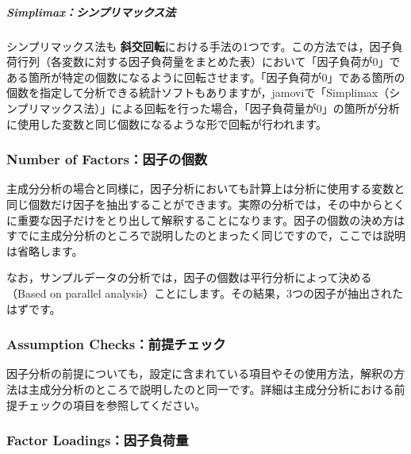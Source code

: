 \documentclass[
  12pt,
  a5jpaper,
  lualatex, ja=standard]{bxjsbook}
\renewcommand{\emph}[1]{\textbf{\color{emph} #1}}
\begin{document}
\hypertarget{fa-efa-rotation-simplimax}{%
\subparagraph*{Simplimax：シンプリマックス法}\label{fa-efa-rotation-simplimax}}

シンプリマックス法も\emph{斜交回転}における手法の1つです。この方法では，因子負荷行列（各変数に対する因子負荷量をまとめた表）において「因子負荷が0」である箇所が特定の個数になるように回転させます。「因子負荷が0」である箇所の個数を指定して分析できる統計ソフトもありますが，jamoviで「Simplimax（シンプリマックス法）」による回転を行った場合，「因子負荷量が0」の箇所が分析に使用した変数と同じ個数になるような形で回転が行われます。

\hypertarget{subsub:factor-efa-number-of-factors}{%
\subsubsection*{Number of Factors：因子の個数}\label{subsub:factor-efa-number-of-factors}}

主成分分析の場合と同様に，因子分析においても計算上は分析に使用する変数と同じ個数だけ因子を抽出することができます。実際の分析では，その中からとくに重要な因子だけをとり出して解釈することになります。因子の個数の決め方はすでに主成分分析のところで説明したのとまったく同じですので，ここでは説明は省略します。

なお，サンプルデータの分析では，因子の個数は平行分析によって決める（Based on parallel analysis）ことにします。その結果，3つの因子が抽出されたはずです。

\hypertarget{subsub:factor-efa-assumption-checks}{%
\subsubsection*{Assumption Checks：前提チェック}\label{subsub:factor-efa-assumption-checks}}

因子分析の前提についても，設定に含まれている項目やその使用方法，解釈の方法は主成分分析のところで説明したのと同一です。詳細は主成分分析における前提チェックの項目を参照してください。

\hypertarget{subsub:factor-efa-factor-loadings}{%
\subsubsection*{Factor Loadings：因子負荷量}\label{subsub:factor-efa-factor-loadings}}
\end{document}
